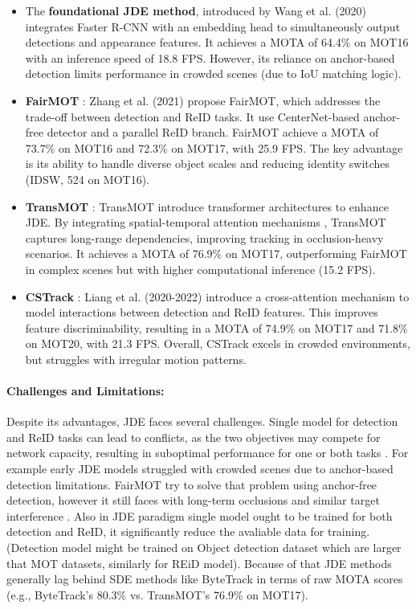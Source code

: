 \documentclass[12pt, a4paper]{article}
\begin{document}
\begin{itemize}
\item The \textbf{foundational JDE method}, introduced by Wang et al. (2020) \cite{Toward-RLMOT} integrates Faster R-CNN \cite{fasterRCNN} with an embedding head to simultaneously output detections and appearance features. It achieves a MOTA of 64.4\% on MOT16 with an inference speed of 18.8 FPS. However, its reliance on anchor-based detection limits performance in crowded scenes (due to IoU matching logic). 
\item \textbf{FairMOT} \cite{FairMOT}: Zhang et al. (2021) propose FairMOT, which addresses the trade-off between detection and ReID tasks. It use CenterNet-based anchor-free detector and a parallel ReID branch. FairMOT achieve a MOTA of 73.7\% on MOT16 and 72.3\% on MOT17, with 25.9 FPS. The key advantage is its ability to handle diverse object scales and reducing identity switches (IDSW, 524 on MOT16).
\item \textbf{TransMOT} \cite{TransMOT}: TransMOT introduce transformer architectures to enhance JDE. By integrating spatial-temporal attention mechanisms \cite{Spatial-Temporal-Attention}, TransMOT captures long-range dependencies, improving tracking in occlusion-heavy scenarios. It achieves a MOTA of 76.9\% on MOT17, outperforming FairMOT in complex scenes but with higher computational inference (15.2 FPS).
\item \textbf{CSTrack} \cite{CSTrack}: Liang et al. (2020-2022) introduce a cross-attention mechanism to model interactions between detection and ReID features. This improves feature discriminability, resulting in a MOTA of 74.9\% on MOT17 and 71.8\% on MOT20, with 21.3 FPS. Overall, CSTrack excels in crowded environments, but struggles with irregular motion patterns.
\end{itemize}

\paragraph{Challenges and Limitations:}
Despite its advantages, JDE faces several challenges. Single model for detection and ReID tasks can lead to conflicts, as the two objectives may compete for network capacity, resulting in suboptimal performance for one or both tasks \cite{JDE-person-search}. For example early JDE models \cite{JDE-person-search, Toward-RLMOT} struggled with crowded scenes due to anchor-based detection limitations. FairMOT try to solve that problem using anchor-free detection, however it still faces with long-term occlusions and similar target interference \cite{FairMOT, sota-trackets-survey}. Also in JDE paradigm single model ought to be trained for both detection and ReID, it significantly reduce the avaliable data for training. (Detection model might be trained on Object detection dataset which are larger that MOT datasets, similarly for REiD model). Because of that JDE methods generally lag behind SDE methods like ByteTrack \cite{ByteTrack} in terms of raw MOTA scores (e.g., ByteTrack’s 80.3\% vs. TransMOT’s 76.9\% on MOT17).
\end{document}
